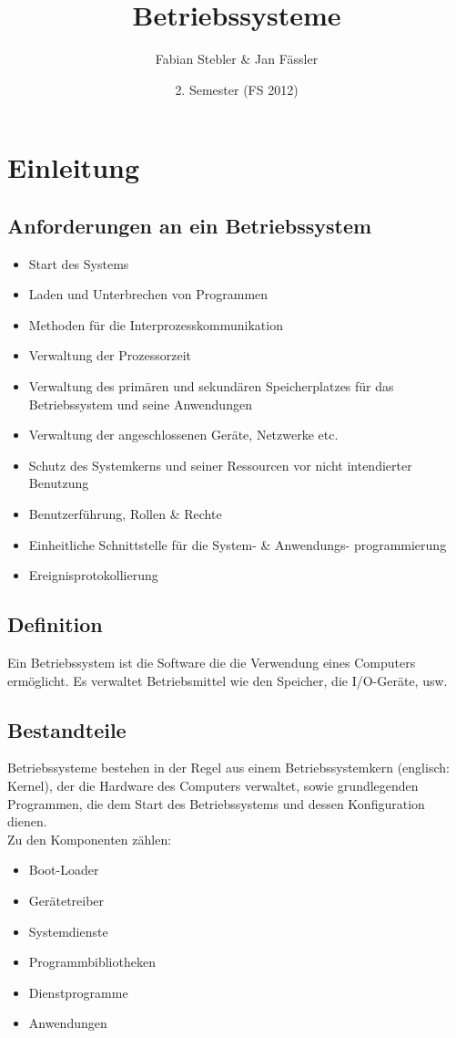 \documentclass[a4paper, 10pt]{article}
\title{Betriebssysteme}
\author{Fabian Stebler \& Jan F\"assler}
\date{2. Semester (FS 2012)}
\begin{document}
\maketitle
\newpage
\section{Einleitung}

\subsection{Anforderungen an ein Betriebssystem}
\begin{itemize}
	\item Start des Systems
	\item Laden und Unterbrechen von Programmen
	\item Methoden für die Interprozesskommunikation
	\item Verwaltung der Prozessorzeit
	\item Verwaltung des primären und sekundären Speicherplatzes für das Betriebssystem und seine Anwendungen
	\item Verwaltung der angeschlossenen Geräte, Netzwerke etc.
	\item Schutz des Systemkerns und seiner Ressourcen vor nicht intendierter Benutzung
	\item Benutzerführung, Rollen \& Rechte	
	\item Einheitliche Schnittstelle für die System- \& Anwendungs- programmierung
	\item Ereignisprotokollierung
\end{itemize}
\subsection{Definition}
Ein Betriebssystem ist die Software die die Verwendung eines Computers erm\"oglicht. Es verwaltet Betriebsmittel wie den Speicher, die I/O-Ger\"ate, usw.
\subsection{Bestandteile}
Betriebssysteme bestehen in der Regel aus einem Betriebssystemkern (englisch: Kernel), der die Hardware des Computers verwaltet, sowie grundlegenden Programmen, die dem Start des Betriebssystems und dessen Konfiguration dienen.\\
Zu den Komponenten z\"ahlen:
\begin{itemize}
\item Boot-Loader
\item Ger\"atetreiber
\item Systemdienste
\item Programmbibliotheken
\item Dienstprogramme
\item Anwendungen
\end{itemize}
\end{document}
